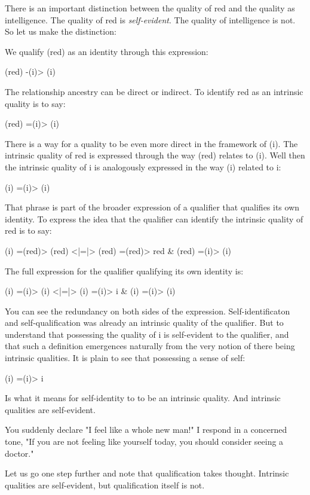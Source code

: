 \documentclass[runningheads]{llncs}
\begin{document}
There is an important distinction between the quality of red and the quality as intelligence. The quality of red is \emph{self-evident}. The quality of intelligence is not. So let us make the distinction:

We qualify (red) as an identity through this expression:

(red) -(i)> (i)

The relationship ancestry can be direct or indirect. To identify red as an intrinsic quality is to say:

(red) =(i)> (i)

There is a way for a quality to be even more direct in the framework of (i). The intrinsic quality of red is expressed through the way (red) relates to (i). Well then the intrinsic quality of i is analogously expressed in the way (i) related to i: 

(i) =(i)> (i)

That phrase is part of the broader expression of a qualifier that qualifies its own identity. To express the idea that the qualifier can identify the intrinsic quality of red is to say:

(i) =(red)> (red) <|=|> (red) =(red)> red \& (red) =(i)> (i)

The full expression for the qualifier qualifying its own identity is:

(i) =(i)> (i) <|=|> (i) =(i)> i \& (i) =(i)> (i)

You can see the redundancy on both sides of the expression. Self-identificaton and self-qualification was already an intrinsic quality of the qualifier. But to understand that possessing the quality of i is self-evident to the qualifier, and that such a definition emergences naturally from the very notion of there being intrinsic qualities. It is plain to see that possessing a sense of self:

(i) =(i)> i

Is what it means for self-identity to to be an intrinsic quality. And intrinsic qualities are self-evident. 

\setcounter{definition}{1}
\begin{example}
	You suddenly declare "I feel like a whole new man!" I respond in a concerned tone, "If you are not feeling like yourself today, you should consider seeing a doctor."
\end{example}

Let us go one step further and note that qualification takes thought. Intrinsic qualities are self-evident, but qualification itself is not. 
\end{document}
